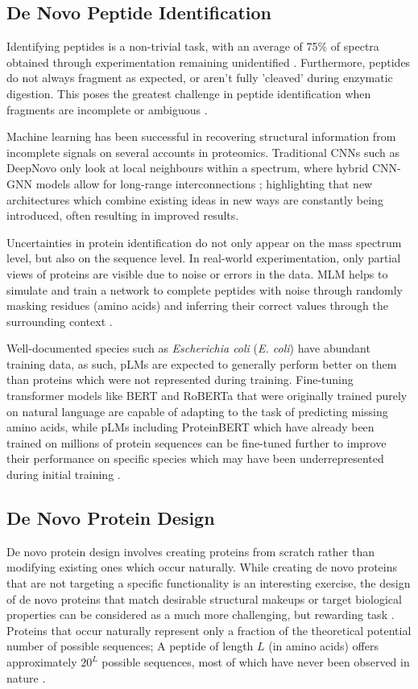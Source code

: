 \documentclass[journal]{IEEEtran}
\begin{document}
\subsection{De Novo Peptide Identification}
Identifying peptides is a non-trivial task, with an average of 75\% of spectra obtained
through experimentation remaining unidentified \cite{MCDONNELL20232732}. Furthermore, peptides do not always fragment as expected, 
or aren't fully 'cleaved' during enzymatic digestion. This poses the greatest challenge in 
peptide identification when fragments are incomplete or ambiguous \cite{MCDONNELL20232732}.

Machine learning has been successful in recovering structural information from incomplete signals
on several accounts in proteomics. Traditional CNNs such as DeepNovo only look at local neighbours
within a spectrum, where hybrid CNN-GNN models allow for long-range interconnections \cite{MCDONNELL20232732};
highlighting that new architectures which combine existing ideas in new ways
are constantly being introduced, often resulting in improved results.

Uncertainties in protein identification do not only appear on the mass spectrum level, but also on the sequence level.
In real-world experimentation, only partial views of proteins
are visible due to noise or errors in the data. MLM helps to simulate and train
a network to complete peptides with noise through randomly masking residues (amino acids)
and inferring their correct values through the surrounding context \cite{kharkar2024llmproteins}.

Well-documented species such as \textit{Escherichia coli} (\textit{E. coli}) have abundant training data, as such, pLMs are expected to generally perform
better on them than proteins which were not represented during training. 
Fine-tuning transformer models like BERT and RoBERTa that were originally trained purely on natural language are capable
of adapting to the task of predicting missing amino acids, while pLMs including ProteinBERT
which have already been trained on millions of protein sequences can be fine-tuned further
to improve their performance on specific species which may have been underrepresented during initial training \cite{kharkar2024llmproteins}.

\subsection{De Novo Protein Design}
De novo protein design involves creating proteins from scratch rather than modifying existing ones
which occur naturally. While creating de novo proteins that are not targeting a specific functionality is an interesting exercise,
the design of de novo proteins that match desirable structural makeups or 
target biological properties can be considered as a much more challenging, but rewarding task \cite{doi:10.1126/sciadv.adl4000}.
Proteins that occur naturally represent only a fraction of the theoretical potential number of possible
sequences; A peptide of length $L$ (in amino acids) offers approximately $20^L$ possible sequences, most of which 
have never been observed in nature \cite{xia2025apexgensimultaneousdesignpeptide}.
\end{document}
